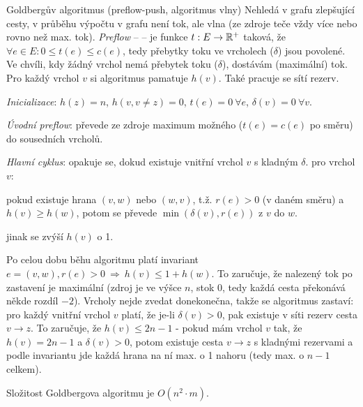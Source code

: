\begin{algoritmusN}{Goldbergův algoritmus (preflow-push, algoritmus vlny)}
Nehledá v grafu zlepšující cesty, v průběhu výpočtu v grafu není tok, ale vlna (ze zdroje teče vždy více nebo rovno než max. tok). \emph{Preflow} --  -- je funkce $t:E\to\mathbb{R}^{+}$ taková, že $\forall e\in E: 0\leq t(e)\leq c(e)$, tedy přebytky toku ve vrcholech ($\delta$) jsou povolené. Ve chvíli, kdy žádný vrchol nemá přebytek toku ($\delta$), dostávám (maximální) tok. Pro každý vrchol $v$ si algoritmus pamatuje  $h(v)$.  Také pracuje se sítí rezerv.
\begin{pitemize}
    \item \emph{Inicializace}: $h(z)=n$, $h(v,v\neq z)=0$, $t(e)=0\ \forall e$, $\delta(v)=0\ \forall v$.
    \item \emph{Úvodní preflow}: převede ze zdroje maximum možného ($t(e)=c(e)$ po směru) do sousedních vrcholů.
    \item \emph{Hlavní cyklus}: opakuje se, dokud existuje vnitřní vrchol $v$ s kladným $\delta$. pro vrchol $v$:
    \begin{pitemize}
        \item pokud existuje hrana $(v,w)$ nebo $(w,v)$, t.ž. $r(e) > 0$ (v daném směru) a $h(v)\geq h(w)$, potom se převede $\min(\delta(v),r(e))$ z $v$ do $w$.
	\item jinak se zvýší $h(v)$ o 1.
    \end{pitemize}
\end{pitemize}

Po celou dobu běhu algoritmu platí invariant $e=(v,w),r(e)>0\ \Rightarrow\ h(v)\leq 1+h(w)$. To zaručuje, že nalezený tok po zastavení je maximální (zdroj je ve výšce $n$, stok $0$, tedy každá cesta překonává někde rozdíl $-2$). Vrcholy nejde zvedat donekonečna, takže se algoritmus zastaví: pro každý vnitřní vrchol $v$ platí, že je-li $\delta(v)>0$, pak existuje v síti rezerv cesta $v\to z$. To zaručuje, že $h(v)\leq 2n-1$ - pokud mám vrchol $v$ tak, že $h(v)=2n-1$ a $\delta(v)>0$, potom existuje cesta $v\to z$ s kladnými rezervami a podle invariantu jde každá hrana na ní max. o 1 nahoru (tedy max. o $n-1$ celkem).

Složitost Goldbergova algoritmu je $O(n^2\cdot m)$.
\end{algoritmusN}
